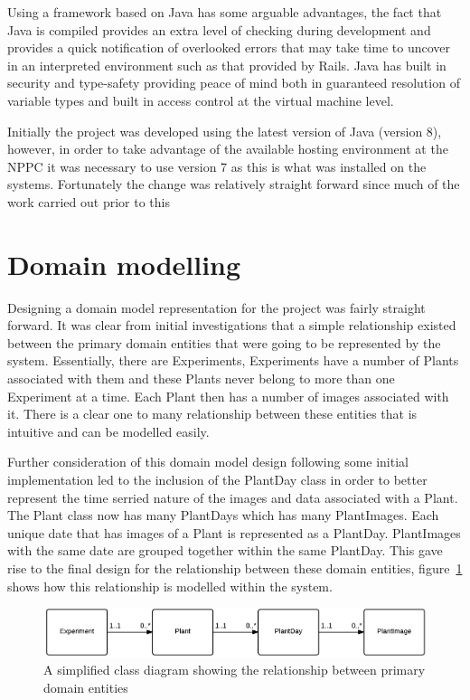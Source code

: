 Using a framework based on Java has some arguable advantages, the fact that Java is compiled provides an extra level of checking during development and provides a quick notification of overlooked errors that may take time to uncover in an interpreted environment such as that provided by Rails. Java has built in security and type-safety providing peace of mind both in guaranteed resolution of variable types and built in access control at the virtual machine level. 

Initially the project was developed using the latest version of Java (version 8), however, in order to take advantage of the available hosting environment at the NPPC it was necessary to use version 7 as this is what was installed on the systems. Fortunately the change was relatively straight forward since  much of the work carried out prior to this 





\section{Domain modelling}

Designing a domain model representation for the project was fairly straight forward. It was clear from initial investigations that a simple relationship existed between the primary domain entities that were going to be represented by the system. Essentially, there are Experiments, Experiments have a number of Plants associated with them and these Plants never belong to more than one Experiment at a time. Each Plant then has a number of images associated with it. There is a clear one to many relationship between these entities that is intuitive and can be modelled easily.

Further consideration of this domain model design following some initial implementation led to the inclusion of the PlantDay class in order to better represent the time serried nature of the images and data associated with a Plant. The Plant class now has many PlantDays which has many PlantImages. Each unique date that has images of a Plant is represented as a PlantDay. PlantImages with the same date are grouped together within the same PlantDay. This gave rise to the final design for the relationship between these domain entities, figure~\ref{fig:domain1} shows how this relationship is modelled within the system. 


\begin{figure}[H]
    \centering
    \includegraphics[width=\textwidth]{images/design/domain1}
    \caption{A simplified class diagram showing the relationship between primary domain entities}
    \label{fig:domain1}
\end{figure}


